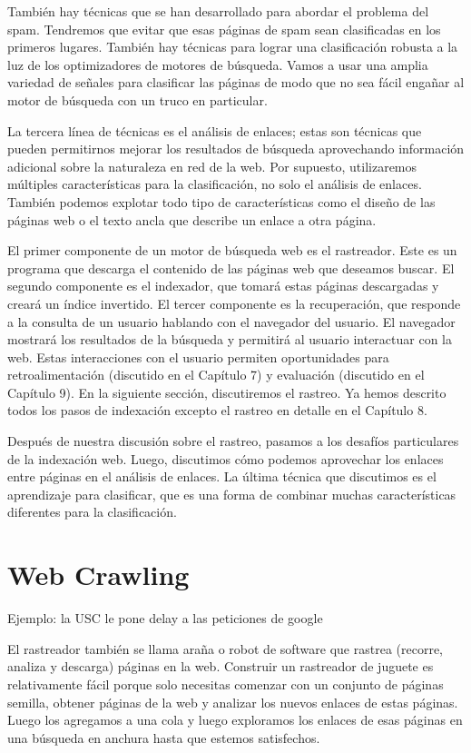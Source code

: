 También hay técnicas que se han desarrollado para abordar el problema del spam. Tendremos que evitar que esas páginas de spam sean clasificadas en los primeros lugares. También hay técnicas para lograr una clasificación robusta a la luz de los optimizadores de motores de búsqueda. Vamos a usar una amplia variedad de señales para clasificar las páginas de modo que no sea fácil engañar al motor de búsqueda con un truco en particular.

La tercera línea de técnicas es el análisis de enlaces; estas son técnicas que pueden permitirnos mejorar los resultados de búsqueda aprovechando información adicional sobre la naturaleza en red de la web. Por supuesto, utilizaremos múltiples características para la clasificación, no solo el análisis de enlaces. También podemos explotar todo tipo de características como el diseño de las páginas web o el texto ancla que describe un enlace a otra página.

El primer componente de un motor de búsqueda web es el rastreador. Este es un programa que descarga el contenido de las páginas web que deseamos buscar. El segundo componente es el indexador, que tomará estas páginas descargadas y creará un índice invertido. El tercer componente es la recuperación, que responde a la consulta de un usuario hablando con el navegador del usuario. El navegador mostrará los resultados de la búsqueda y permitirá al usuario interactuar con la web. Estas interacciones con el usuario permiten oportunidades para retroalimentación (discutido en el Capítulo 7) y evaluación (discutido en el Capítulo 9). En la siguiente sección, discutiremos el rastreo. Ya hemos descrito todos los pasos de indexación excepto el rastreo en detalle en el Capítulo 8.

Después de nuestra discusión sobre el rastreo, pasamos a los desafíos particulares de la indexación web. Luego, discutimos cómo podemos aprovechar los enlaces entre páginas en el análisis de enlaces. La última técnica que discutimos es el aprendizaje para clasificar, que es una forma de combinar muchas características diferentes para la clasificación.

\section{Web Crawling}

Ejemplo: la USC le pone delay a las peticiones de google 

El rastreador también se llama araña o robot de software que rastrea (recorre, analiza y descarga) páginas en la web. Construir un rastreador de juguete es relativamente fácil porque solo necesitas comenzar con un conjunto de páginas semilla, obtener páginas de la web y analizar los nuevos enlaces de estas páginas. Luego los agregamos a una cola y luego exploramos los enlaces de esas páginas en una búsqueda en anchura hasta que estemos satisfechos.

